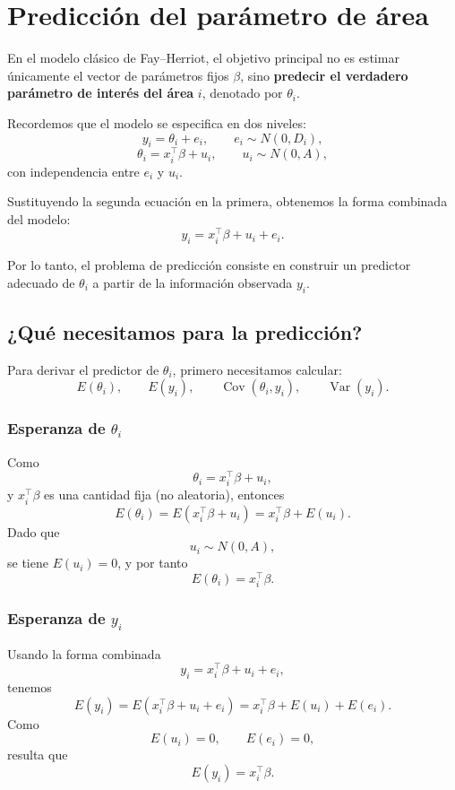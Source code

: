 \section{Predicción del parámetro de área}

En el modelo clásico de Fay--Herriot, el objetivo principal no es estimar únicamente el vector de parámetros fijos $\beta$, sino \textbf{predecir el verdadero parámetro de interés del área} $i$, denotado por $\theta_i$.

Recordemos que el modelo se especifica en dos niveles:
\[
y_i=\theta_i+e_i, \qquad e_i\sim N(0,D_i),
\]
\[
\theta_i=x_i^{\top}\beta+u_i, \qquad u_i\sim N(0,A),
\]
con independencia entre $e_i$ y $u_i$.

Sustituyendo la segunda ecuación en la primera, obtenemos la forma combinada del modelo:
\[
y_i=x_i^{\top}\beta+u_i+e_i.
\]

Por lo tanto, el problema de predicción consiste en construir un predictor adecuado de $\theta_i$ a partir de la información observada $y_i$.

\subsection{¿Qué necesitamos para la predicción?}

Para derivar el predictor de $\theta_i$, primero necesitamos calcular:
\[
E(\theta_i), \qquad E(y_i), \qquad \operatorname{Cov}(\theta_i,y_i), \qquad \operatorname{Var}(y_i).
\]

\subsubsection*{Esperanza de $\theta_i$}

Como
\[
\theta_i=x_i^{\top}\beta+u_i,
\]
y $x_i^{\top}\beta$ es una cantidad fija (no aleatoria), entonces
\[
E(\theta_i)=E(x_i^{\top}\beta+u_i)=x_i^{\top}\beta+E(u_i).
\]
Dado que
\[
u_i\sim N(0,A),
\]
se tiene $E(u_i)=0$, y por tanto
\[
E(\theta_i)=x_i^{\top}\beta.
\]

\subsubsection*{Esperanza de $y_i$}

Usando la forma combinada
\[
y_i=x_i^{\top}\beta+u_i+e_i,
\]
tenemos
\[
E(y_i)=E(x_i^{\top}\beta+u_i+e_i)=x_i^{\top}\beta+E(u_i)+E(e_i).
\]
Como
\[
E(u_i)=0, \qquad E(e_i)=0,
\]
resulta que
\[
E(y_i)=x_i^{\top}\beta.
\]


